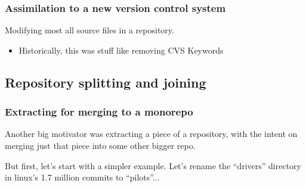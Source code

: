 \documentclass[compress,t,aspectratio=169]{beamer}
\begin{document}
\begin{frame}
  \frametitle{Assimilation to a new version control system}

  Modifying most all source files in a repository.
  \begin{itemize}
    \item Historically, this was stuff like removing CVS Keywords
  \end{itemize}

  \vspace*{\baselineskip}

\end{frame}

\subsection[Restructuring]{Repository splitting and joining}

\begin{frame}
  \frametitle{Extracting for merging to a monorepo}

  Another big motivator was extracting a piece of a repository, with
  the intent on merging just that piece into some other bigger repo.

  \vspace*{\baselineskip}
  But first, let's start with a simpler example.  Let's rename the
  ``drivers'' directory in linux's 1.7 million commits to ``pilots''...
\end{frame}
\end{document}
